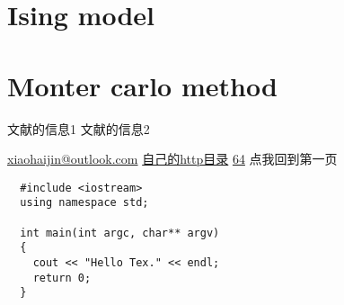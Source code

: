 \documentclass[11pt,UTF8,hyperref,openany]{ctexbook}
\begin{document}
\section{Ising model}
\section{Monter carlo method}

\begin{thebibliography}{99}
文献的信息1
文献的信息2
\end{thebibliography}

\noindent\url{xiaohaijin@outlook.com}\newline
\href{http://192.168.1.119/self/index.html}{自己的http目录}\newline
\href{http://10.10.11.64}{64}\newline
点我回到第一页

\begin{linenumbers}[2]%
  \newline
\end{linenumbers}

\begin{lstlisting}
  #include <iostream>
  using namespace std;

  int main(int argc, char** argv)
  {
    cout << "Hello Tex." << endl;
    return 0;
  }
\end{lstlisting}
\end{document}
